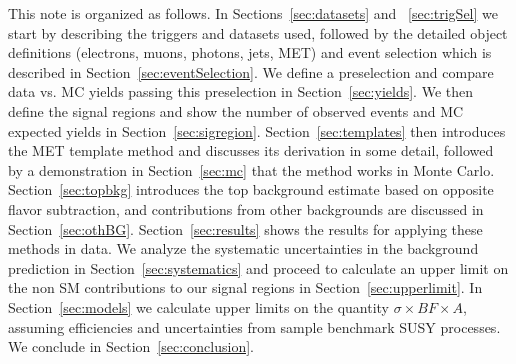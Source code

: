 This note is organized as follows. 
In Sections~\ref{sec:datasets} and ~\ref{sec:trigSel} we start by describing 
the triggers and datasets used, followed by the detailed object definitions (electrons, muons, photons,
jets, MET) and event selection which is described in Section~\ref{sec:eventSelection}. 
We define a preselection and compare data vs. MC yields passing this preselection in Section~\ref{sec:yields}.
We then define the signal regions and show the number of observed events and MC expected yields in Section~\ref{sec:sigregion}.
Section~\ref{sec:templates} then introduces the MET template method and discusses its derivation 
in some detail, followed by a demonstration in Section~\ref{sec:mc} that the method works in Monte Carlo.
Section~\ref{sec:topbkg} introduces the top background estimate based on opposite flavor subtraction, and contributions from other backgrounds are discussed in Section~\ref{sec:othBG}.
Section~\ref{sec:results} shows the results for applying these methods in data.
We analyze the systematic uncertainties in the background prediction in Section~\ref{sec:systematics} 
and proceed to calculate an upper limit on the non SM contributions to our signal regions in Section~\ref{sec:upperlimit}. In Section~\ref{sec:models} we calculate upper limits on the quantity $\sigma \times BF \times A$, assuming
efficiencies and uncertainties from sample benchmark SUSY processes. We conclude in Section~\ref{sec:conclusion}.